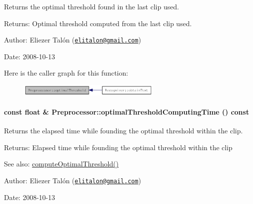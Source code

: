 Returns the optimal threshold found in the last clip used. 

\begin{Desc}
\item[Returns:]Optimal threshold computed from the last clip used.\end{Desc}
\begin{Desc}
\item[Author:]Eliezer Talón (\href{mailto:elitalon@gmail.com}{\tt elitalon@gmail.com}) \end{Desc}
\begin{Desc}
\item[Date:]2008-10-13 \end{Desc}


Here is the caller graph for this function:\nopagebreak
\begin{figure}[H]
\begin{center}
\leavevmode
\includegraphics[width=196pt]{class_preprocessor_a44dff024a5b29752780bd4aa0d53d81_icgraph}
\end{center}
\end{figure}
\hypertarget{class_preprocessor_72aa2eb5f3a7e7ee0d3ca27ddd6bfc5e}{
\paragraph[{optimalThresholdComputingTime}]{\setlength{\rightskip}{0pt plus 5cm}const float \& Preprocessor::optimalThresholdComputingTime () const}\hfill}
\label{class_preprocessor_72aa2eb5f3a7e7ee0d3ca27ddd6bfc5e}


Returns the elapsed time while founding the optimal threshold within the clip. 

\begin{Desc}
\item[Returns:]Elapsed time while founding the optimal threshold within the clip\end{Desc}
\begin{Desc}
\item[See also:]\hyperlink{class_preprocessor_ac2f414d6f4f917419f33f6067eb8634}{computeOptimalThreshold()}\end{Desc}
\begin{Desc}
\item[Author:]Eliezer Talón (\href{mailto:elitalon@gmail.com}{\tt elitalon@gmail.com}) \end{Desc}
\begin{Desc}
\item[Date:]2008-10-13 \end{Desc}


